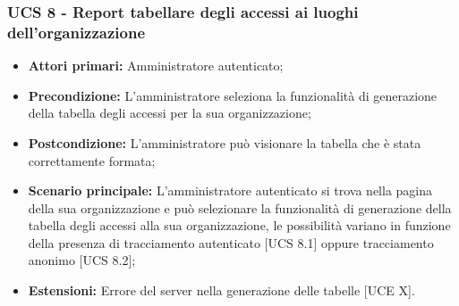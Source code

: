 \subsubsection{UCS 8 - Report tabellare degli accessi ai luoghi dell'organizzazione}%
\begin{itemize}
\item \textbf{Attori primari:} Amministratore autenticato;
\item \textbf{Precondizione:} L'amministratore seleziona la funzionalità di generazione della tabella degli accessi per la sua organizzazione;
\item \textbf{Postcondizione:} L'amministratore può visionare la tabella che è stata correttamente formata;
\item \textbf{Scenario principale:} L'amministratore autenticato si trova nella pagina della sua organizzazione e può selezionare la funzionalità di generazione della tabella degli accessi alla sua organizzazione, le possibilità variano in funzione della presenza di tracciamento autenticato [UCS 8.1] oppure tracciamento anonimo [UCS 8.2];
\item \textbf{Estensioni:} Errore del server nella generazione delle tabelle [UCE X].
\end{itemize}

